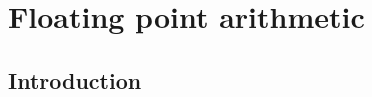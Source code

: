 \chapter{Floating point arithmetic}%
\label{cha:rounding_errors}
\minitoc

\section*{Introduction}%
\label{sec:introduction}

